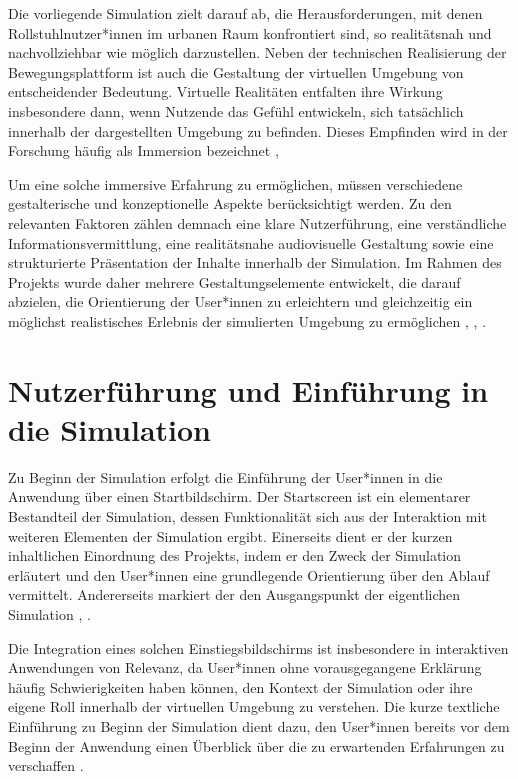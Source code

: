 Die vorliegende Simulation zielt darauf ab, die Herausforderungen, mit denen Rollstuhlnutzer*innen im urbanen Raum konfrontiert sind, so realitätsnah und nachvollziehbar wie möglich darzustellen. Neben der technischen Realisierung der Bewegungsplattform ist auch die Gestaltung der virtuellen Umgebung von entscheidender Bedeutung. Virtuelle Realitäten entfalten ihre Wirkung insbesondere dann, wenn Nutzende das Gefühl entwickeln, sich tatsächlich innerhalb der dargestellten Umgebung zu befinden. Dieses Empfinden wird in der Forschung häufig als Immersion bezeichnet \cite{Mutterlein2021}, 

Um eine solche immersive Erfahrung zu ermöglichen, müssen verschiedene gestalterische und konzeptionelle Aspekte berücksichtigt werden. Zu den relevanten Faktoren zählen demnach eine klare Nutzerführung, eine verständliche Informationsvermittlung, eine realitätsnahe audiovisuelle Gestaltung sowie eine strukturierte Präsentation der Inhalte innerhalb der Simulation. Im Rahmen des Projekts wurde daher mehrere Gestaltungselemente entwickelt, die darauf abzielen, die Orientierung der User*innen zu erleichtern und gleichzeitig ein möglichst realistisches Erlebnis der simulierten Umgebung zu ermöglichen \cite{Jason2015}, \cite{Wilbur1997}, \cite{Bowman2004}.

\section{Nutzerführung und Einführung in die Simulation}
Zu Beginn der Simulation erfolgt die Einführung der User*innen in die Anwendung über einen Startbildschirm. Der Startscreen ist ein elementarer Bestandteil der Simulation, dessen Funktionalität sich aus der Interaktion mit weiteren Elementen der Simulation ergibt. Einerseits dient er der kurzen inhaltlichen Einordnung des Projekts, indem er den Zweck der Simulation erläutert und den User*innen eine grundlegende Orientierung über den Ablauf vermittelt. Andererseits markiert der den Ausgangspunkt der eigentlichen Simulation \cite{Bowman2004}, \cite{Nielsen1993}.

Die Integration eines solchen Einstiegsbildschirms ist insbesondere in interaktiven Anwendungen von Relevanz, da User*innen ohne vorausgegangene Erklärung häufig Schwierigkeiten haben können, den Kontext der Simulation oder ihre eigene Roll innerhalb der virtuellen Umgebung zu verstehen. Die kurze textliche Einführung zu Beginn der Simulation dient dazu, den User*innen bereits vor dem Beginn der Anwendung einen Überblick über die zu erwartenden Erfahrungen zu verschaffen \cite{Bowman2004}.

